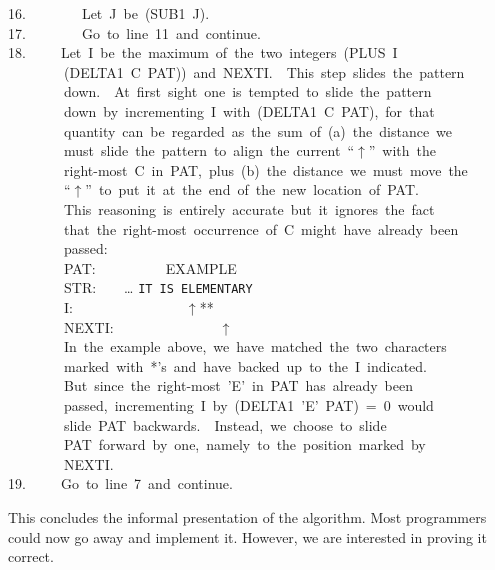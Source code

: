 \documentclass[11pt]{book}
\newenvironment{pubasis}{\begin{flushleft}\ttfamily\small}{\normalsize\rmfamily\end{flushleft}}
\begin{document}
\begin{pubasis}
16.~~~~~~~~Let~J~be~(SUB1~J).\\

17.~~~~~~~~Go~to~line~11~and~continue.\\

18.~~~~~Let~I~be~the~maximum~of~the~two~integers~(PLUS~I\\
~~~~~~~~(DELTA1~C~PAT))~and~NEXTI.~~This~step~slides~the~pattern\\
~~~~~~~~down.~~At~first~sight~one~is~tempted~to~slide~the~pattern\\
~~~~~~~~down~by~incrementing~I~with~(DELTA1~C~PAT),~for~that\\
~~~~~~~~quantity~can~be~regarded~as~the~sum~of~(a)~the~distance~we\\
~~~~~~~~must~slide~the~pattern~to~align~the~current~``$\uparrow$''~with~the\\
~~~~~~~~right-most~C~in~PAT,~plus~(b)~the~distance~we~must~move~the\\
~~~~~~~~``$\uparrow$''~to~put~it~at~the~end~of~the~new~location~of~PAT.\\
~~~~~~~~This~reasoning~is~entirely~accurate~but~it~ignores~the~fact\\
~~~~~~~~that~the~right-most~occurrence~of~C~might~have~already~been\\
~~~~~~~~passed:\\

~~~~~~~~PAT:~~~~~~~~~~EXAMPLE\\
~~~~~~~~STR:~~~~\ldots{} \verb*+IT IS ELEMENTARY+\\
~~~~~~~~I:~~~~~~~~~~~~~~~~$\uparrow$**\\
~~~~~~~~NEXTI:~~~~~~~~~~~~~~~$\uparrow$\\

~~~~~~~~In~the~example~above,~we~have~matched~the~two~characters~\\
~~~~~~~~marked~with~*'s~and~have~backed~up~to~the~I~indicated.\\
~~~~~~~~But~since~the~right-most~'E'~in~PAT~has~already~been\\
~~~~~~~~passed,~incrementing~I~by~(DELTA1~'E'~PAT)~=~0~would\\
~~~~~~~~slide~PAT~backwards.~~Instead,~we~choose~to~slide\\
~~~~~~~~PAT~forward~by~one,~namely~to~the~position~marked~by\\
~~~~~~~~NEXTI.\\

19.~~~~~Go~to~line~7~and~continue.\\
\end{pubasis}
This concludes the informal presentation of the algorithm.  Most programmers
could now go away and implement it.  However, we are interested in proving it
correct.
\end{document}
